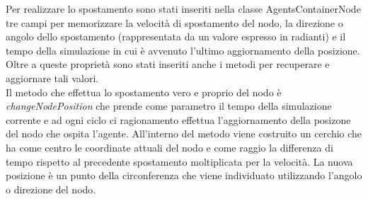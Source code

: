 \documentclass[12pt,a4paper,openright,twoside]{report}
\begin{document}
Per realizzare lo spostamento sono stati inseriti nella classe AgentsContainerNode tre campi per memorizzare la velocit\`a di spostamento del nodo, la direzione o angolo dello spostamento (rappresentata da un valore espresso in radianti) e il tempo della simulazione in cui \`e avvenuto l'ultimo aggiornamento della posizione.
Oltre a queste propriet\`a sono stati inseriti anche i metodi per recuperare e aggiornare tali valori.
\\
Il metodo che effettua lo spostamento vero e proprio del nodo \`e \textit{changeNodePosition} che prende come parametro il tempo della simulazione corrente e ad ogni ciclo ci ragionamento effettua l'aggiornamento della posizone del nodo che ospita l'agente. All'interno del metodo viene costruito un cerchio che ha come centro le coordinate attuali del nodo e come raggio la differenza di tempo rispetto al precedente spostamento moltiplicata per la velocit\`a. La nuova posizione \`e un punto della circonferenza che viene individuato utilizzando l'angolo o direzione del nodo.
\end{document}
